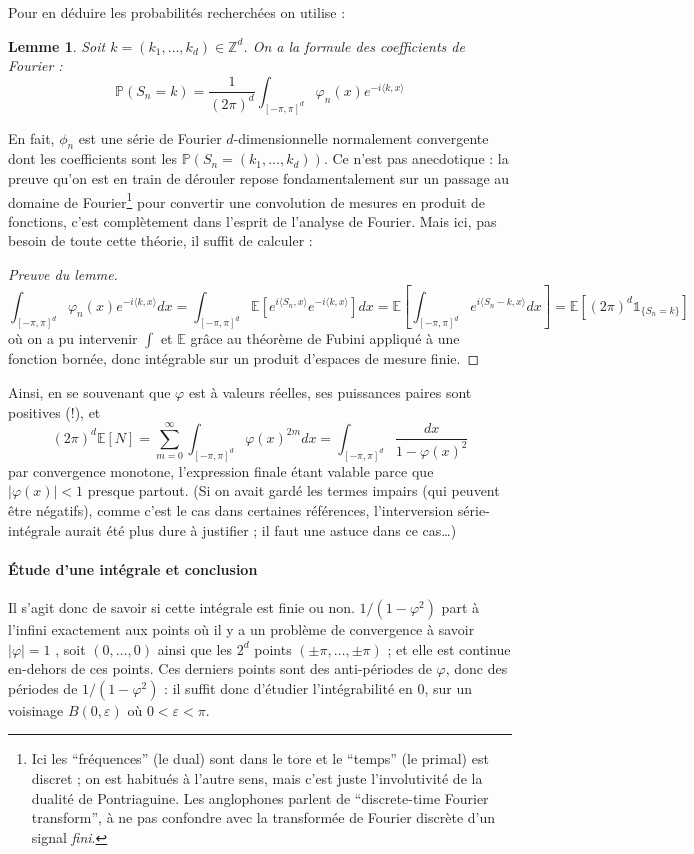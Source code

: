 \documentclass[a4paper, 11pt]{article}
\def\Z{\mathbb{Z}}
\def\P{\mathbb{P}}
\def\E{\mathbb{E}}
\def\Indic{\mathbb{1}}
\newtheorem*{lemma}{Lemme}
\begin{document}
Pour en déduire les probabilités recherchées on utilise :
\begin{lemma} Soit $k = (k_1, \ldots, k_d) \in \Z^d$. On a la formule des
  coefficients de Fourier :
 \[ \displaystyle \P(S_n = k) = \frac{1}{(2\pi)^d} \int_{[-\pi,\pi]^d} \varphi_n(x)e^{-i\langle k,x \rangle} \]
\end{lemma}
En fait, $\phi_n$ est une série de Fourier $d$-dimensionnelle normalement
convergente dont les coefficients sont les $\P(S_n = (k_1, \ldots, k_d))$. Ce
n'est pas anecdotique : la preuve qu'on est en train de dérouler repose
fondamentalement sur un passage au domaine de Fourier\footnote{Ici les
  \enquote{fréquences} (le dual) sont dans le tore et le \enquote{temps} (le
  primal) est discret ; on est habitués à l'autre sens, mais c'est juste
  l'involutivité de la dualité de Pontriaguine. Les anglophones parlent de
  \enquote{discrete-time Fourier transform}, à ne pas confondre avec la
  transformée de Fourier discrète d'un signal \emph{fini}.} pour convertir une
convolution de mesures en produit de fonctions, c'est complètement dans l'esprit
de l'analyse de Fourier. Mais ici, pas besoin de toute cette théorie, il suffit
de calculer :
\begin{proof}[Preuve du lemme]
  \[ \int_{[-\pi,\pi]^d} \varphi_n(x)e^{-i\langle k,x \rangle} dx =
    \int_{[-\pi,\pi]^d} \E\left[ e^{i\langle S_n, x \rangle} e^{-i\langle k,x
        \rangle}\right] dx
    = \E\left[ \int_{[-\pi,\pi]^d} e^{i\langle S_n - k, x \rangle} dx \right]
    = \E\left[ (2\pi)^d \Indic_{\{S_n = k\}} \right] \]
  où on a pu intervenir $\int$ et $\E$ grâce au théorème de Fubini appliqué à
  une fonction bornée, donc intégrable sur un produit d'espaces de mesure finie.
\end{proof}
Ainsi, en se souvenant que $\varphi$ est à valeurs réelles, ses puissances
paires sont positives (!), et
\[ (2\pi)^d \E[N] = \sum_{m=0}^{\infty} \int_{[-\pi,\pi]^d} \varphi(x)^{2m} dx
  = \int_{[-\pi,\pi]^d} \frac{dx}{1 - \varphi(x)^2}\]
par convergence monotone, l'expression finale étant valable parce que
$|\varphi(x)| < 1$ presque partout. (Si on avait gardé les termes impairs (qui
peuvent être négatifs), comme c'est le cas dans certaines références,
l'interversion série-intégrale aurait été plus dure à justifier ; il faut une
astuce dans ce cas…)

\paragraph{Étude d'une intégrale et conclusion} Il s'agit donc de savoir si
cette intégrale est finie ou non. $1/(1-\varphi^2)$ part à l'infini exactement
aux points où il y a un problème de convergence à savoir $|\varphi| = 1$ , soit
$(0,\ldots,0)$ ainsi que les $2^d$ points $(\pm \pi, \ldots, \pm \pi)$ ; et elle
est continue en-dehors de ces points. Ces derniers points sont des anti-périodes
de $\varphi$, donc des périodes de $1/(1-\varphi^2)$ : il suffit donc d'étudier
l'intégrabilité en 0, sur un voisinage $B(0,\varepsilon)$ où $0 < \varepsilon <
\pi$.
\end{document}

